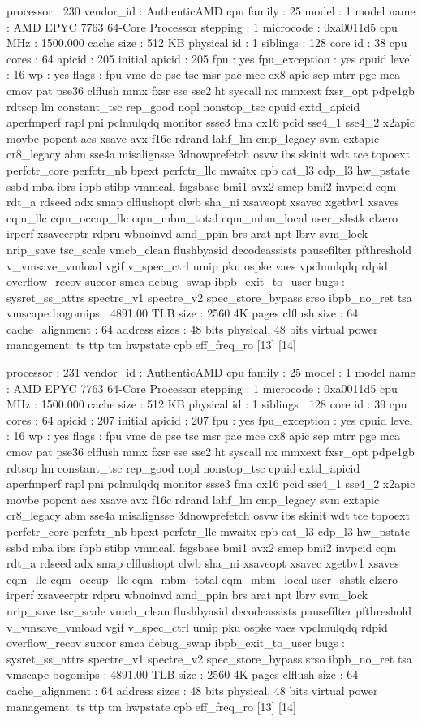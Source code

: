 processor	: 230
vendor_id	: AuthenticAMD
cpu family	: 25
model		: 1
model name	: AMD EPYC 7763 64-Core Processor
stepping	: 1
microcode	: 0xa0011d5
cpu MHz		: 1500.000
cache size	: 512 KB
physical id	: 1
siblings	: 128
core id		: 38
cpu cores	: 64
apicid		: 205
initial apicid	: 205
fpu		: yes
fpu_exception	: yes
cpuid level	: 16
wp		: yes
flags		: fpu vme de pse tsc msr pae mce cx8 apic sep mtrr pge mca cmov pat pse36 clflush mmx fxsr sse sse2 ht syscall nx mmxext fxsr_opt pdpe1gb rdtscp lm constant_tsc rep_good nopl nonstop_tsc cpuid extd_apicid aperfmperf rapl pni pclmulqdq monitor ssse3 fma cx16 pcid sse4_1 sse4_2 x2apic movbe popcnt aes xsave avx f16c rdrand lahf_lm cmp_legacy svm extapic cr8_legacy abm sse4a misalignsse 3dnowprefetch osvw ibs skinit wdt tce topoext perfctr_core perfctr_nb bpext perfctr_llc mwaitx cpb cat_l3 cdp_l3 hw_pstate ssbd mba ibrs ibpb stibp vmmcall fsgsbase bmi1 avx2 smep bmi2 invpcid cqm rdt_a rdseed adx smap clflushopt clwb sha_ni xsaveopt xsavec xgetbv1 xsaves cqm_llc cqm_occup_llc cqm_mbm_total cqm_mbm_local user_shstk clzero irperf xsaveerptr rdpru wbnoinvd amd_ppin brs arat npt lbrv svm_lock nrip_save tsc_scale vmcb_clean flushbyasid decodeassists pausefilter pfthreshold v_vmsave_vmload vgif v_spec_ctrl umip pku ospke vaes vpclmulqdq rdpid overflow_recov succor smca debug_swap ibpb_exit_to_user
bugs		: sysret_ss_attrs spectre_v1 spectre_v2 spec_store_bypass srso ibpb_no_ret tsa vmscape
bogomips	: 4891.00
TLB size	: 2560 4K pages
clflush size	: 64
cache_alignment	: 64
address sizes	: 48 bits physical, 48 bits virtual
power management: ts ttp tm hwpstate cpb eff_freq_ro [13] [14]

processor	: 231
vendor_id	: AuthenticAMD
cpu family	: 25
model		: 1
model name	: AMD EPYC 7763 64-Core Processor
stepping	: 1
microcode	: 0xa0011d5
cpu MHz		: 1500.000
cache size	: 512 KB
physical id	: 1
siblings	: 128
core id		: 39
cpu cores	: 64
apicid		: 207
initial apicid	: 207
fpu		: yes
fpu_exception	: yes
cpuid level	: 16
wp		: yes
flags		: fpu vme de pse tsc msr pae mce cx8 apic sep mtrr pge mca cmov pat pse36 clflush mmx fxsr sse sse2 ht syscall nx mmxext fxsr_opt pdpe1gb rdtscp lm constant_tsc rep_good nopl nonstop_tsc cpuid extd_apicid aperfmperf rapl pni pclmulqdq monitor ssse3 fma cx16 pcid sse4_1 sse4_2 x2apic movbe popcnt aes xsave avx f16c rdrand lahf_lm cmp_legacy svm extapic cr8_legacy abm sse4a misalignsse 3dnowprefetch osvw ibs skinit wdt tce topoext perfctr_core perfctr_nb bpext perfctr_llc mwaitx cpb cat_l3 cdp_l3 hw_pstate ssbd mba ibrs ibpb stibp vmmcall fsgsbase bmi1 avx2 smep bmi2 invpcid cqm rdt_a rdseed adx smap clflushopt clwb sha_ni xsaveopt xsavec xgetbv1 xsaves cqm_llc cqm_occup_llc cqm_mbm_total cqm_mbm_local user_shstk clzero irperf xsaveerptr rdpru wbnoinvd amd_ppin brs arat npt lbrv svm_lock nrip_save tsc_scale vmcb_clean flushbyasid decodeassists pausefilter pfthreshold v_vmsave_vmload vgif v_spec_ctrl umip pku ospke vaes vpclmulqdq rdpid overflow_recov succor smca debug_swap ibpb_exit_to_user
bugs		: sysret_ss_attrs spectre_v1 spectre_v2 spec_store_bypass srso ibpb_no_ret tsa vmscape
bogomips	: 4891.00
TLB size	: 2560 4K pages
clflush size	: 64
cache_alignment	: 64
address sizes	: 48 bits physical, 48 bits virtual
power management: ts ttp tm hwpstate cpb eff_freq_ro [13] [14]


